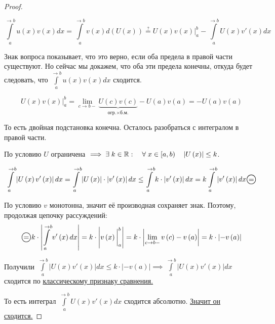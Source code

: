\documentclass[../main.tex]{subfiles}
\begin{document}
\begin{proof}
    
    ~

    \[ \displaystyle\int\limits_{ a}^{ \rightarrow b} u\left( x\right)v\left( x\right)dx= \displaystyle\int\limits_{ a}^{ \rightarrow b} v\left( x\right)d\left( U \left( x\right)\right)\overset{?}{=} U\left( x\right)v \left( x\right)\bigg|_a^b - \displaystyle\int\limits_{ a}^{ \rightarrow b} U \left( x\right)v' \left( x\right)dx\]

    Знак вопроса показывает, что это верно, если оба предела в правой части существуют. Но сейчас мы докажем, что оба эти предела конечны, откуда будет следовать, что \( \displaystyle\int\limits_{ a}^{ \rightarrow b} u \left( x\right)v \left( x\right)dx\) сходится.

    \[ U\left( x\right)v\left( x\right)\bigg|_a^b= \lim\limits_{ c \rightarrow b-}  \underbrace{U\left( c\right)v\left( c\right)}_{\text{огр.} \times \text{б.м.}}-U\left( a\right)v\left( a\right)=-U \left( a\right)v\left( a\right)\]

    То есть двойная подстановка конечна. Осталось разобраться с интегралом в правой части. 
    
    По условию \( U\) ограничена \( \implies \exists \; k \in \mathbb{R} :\quad \forall \; x \in \left[ a,b\right)\quad \left| U\left( x\right) \right|\leq k\).

    \[ \displaystyle\int\limits_{ a}^{ \rightarrow b} \left| U\left( x\right)v' \left( x\right)\right|dx= \displaystyle\int\limits_{ a}^{ \rightarrow b} \left| U\left( x\right)\right| \cdot  \left| v'\left( x\right)\right|dx \leq \displaystyle\int\limits_{ a}^{ \rightarrow b} k \cdot  \left| v'\left( x\right)\right|dx=k \displaystyle\int\limits_{ a}^{ \rightarrow b} \left| v' \left( x\right)\right|dx\oeq\]

    По условию \( v\) монотонна, значит её производная сохраняет знак. Поэтому, продолжая цепочку рассуждений:
    \[ \oeq k \cdot \left| \displaystyle\int\limits_{ a}^{ \rightarrow b} v'\left( x\right)dx\right|=k \cdot \left| v\left( x\right)\bigg|_a^b\right|=k \cdot \left| \lim\limits_{ c \rightarrow b-} v\left( c\right)-v\left( a\right)\right|=k \cdot \left| -v\left( a\right)\right|\]

    Получили \( \displaystyle\int\limits_{ a}^{ \rightarrow b} \left| U\left( x\right)v'\left( x\right)\right|dx \leq k \cdot \left| -v\left( a\right)\right| \implies \displaystyle\int\limits_{ a}^{ \rightarrow b} \left| U\left( x\right)v'\left( x\right)\right|dx\) сходится по \hyperlink{thm:converge_classic}{классическому признаку сравнения.}

    То есть интеграл \( \displaystyle\int\limits_{ a}^{ \rightarrow b} U\left( x\right)v'\left( x\right)dx\) сходится абсолютно. \hyperlink{thm:converge_abs}{Значит он сходится.}
\end{proof}
\end{document}
